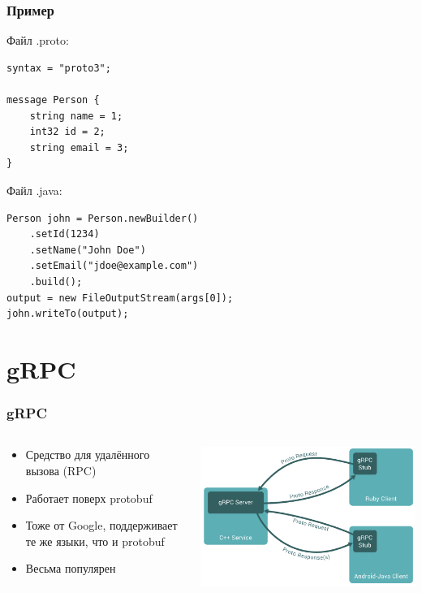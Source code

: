 \documentclass[xetex,mathserif,serif]{beamer}
\begin{document}
    \begin{frame}[fragile]
        \frametitle{Пример}
        Файл .proto:
        \begin{verbatim}
syntax = "proto3";

message Person {
    string name = 1;
    int32 id = 2;
    string email = 3;
}
        \end{verbatim}
        \vspace{2mm}
        Файл .java:
        \begin{verbatim}
Person john = Person.newBuilder()
    .setId(1234)
    .setName("John Doe")
    .setEmail("jdoe@example.com")
    .build();
output = new FileOutputStream(args[0]);
john.writeTo(output);
        \end{verbatim}
    \end{frame}

    \section{gRPC}

    \begin{frame}
        \frametitle{gRPC}
        \begin{columns}
            \begin{column}{0.6\textwidth}
                \begin{itemize}
                    \item Средство для удалённого вызова (RPC)
                    \item Работает поверх protobuf
                    \item Тоже от Google, поддерживает те же языки, что и protobuf
                    \item Весьма популярен
                \end{itemize}
            \end{column}
            \begin{column}{0.4\textwidth}
                \begin{center}
                    \includegraphics[width=\textwidth]{grpc.png}
                \end{center}
            \end{column}
        \end{columns}
    \end{frame}
\end{document}
